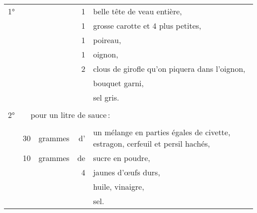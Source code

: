 \medskip
\setlength\tabcolsep{.1em}
\footnotesize
\begin{tabular}{@{}lrrrp{18em}}
\normalsize1°\footnotesize  & & & 1 & belle tête de veau entière,                                         \\
    & & & 1 & grosse carotte et 4 plus petites,                                                           \\
    & & & 1 & poireau,                                                                                    \\
    & & & 1 & oignon,                                                                                     \\
    & & & 2 & clous de girofle qu'on piquera dans l'oignon,                                               \\
    & & &   & bouquet garni,                                                                              \\
    & & &   & sel gris.                                                                                   \\
    & & &   &                                                                                             \\
\normalsize 2° & \multicolumn{4}{l}{\normalsize   pour un litre de sauce :}                               \\
\footnotesize
    & & &   &                                                                                             \\
& 30 & grammes & d' & un mélange en parties égales de civette, estragon, cerfeuil et persil hachés,       \\
& 10 & grammes & de & sucre en poudre,                                                                    \\
&    &         &  4 & jaunes d'œufs durs,                                                                 \\
&    &         &    & huile, vinaigre,                                                                    \\
&    &         &    & sel.                                                                                \\
\end{tabular}
\normalsize

